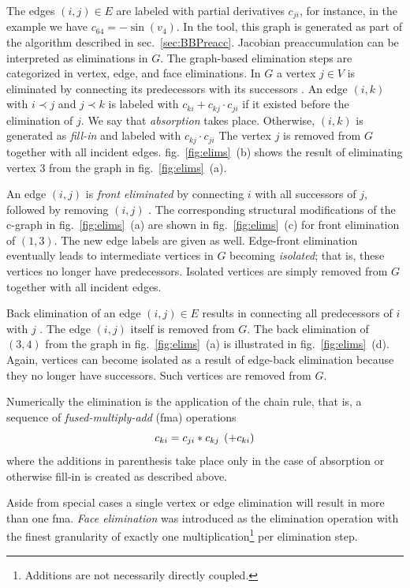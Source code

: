 \documentclass{book}
\newcommand{\refsec}[1]{{sec.~\ref{#1}}}
\newcommand{\reffig}[1]{{fig.~\ref{#1}}}
\begin{document}
The edges $(i,j)\in E$ are labeled with partial derivatives
$c_{ji}$, for instance, in the 
example we have $c_{64}=-\sin(v_4)$.
In the tool, this graph is generated as part of the algorithm described in 
\refsec{sec:BBPreacc}.
Jacobian preaccumulation can be interpreted as eliminations in $G$.
The graph-based elimination steps are categorized in vertex, edge, and face 
eliminations. 
In $G$ a vertex $j \in V$ is eliminated by connecting its predecessors with
its successors \cite{Griewank1991OtC}.
An edge $(i,k)$ with
$i \prec j$ and $j \prec k$ is labeled with
$c_{ki}+c_{kj} \cdot c_{ji}$ if it existed before the elimination of $j.$
We say that {\em absorption} takes place.
Otherwise, $(i,k)$ is generated as {\em fill-in} and labeled
with $c_{kj} \cdot c_{ji}$
The vertex $j$ is removed from
$G$ together with all incident edges. 
\reffig{fig:elims}~(b) shows the result of eliminating vertex $3$
from the graph in \reffig{fig:elims}~(a).

An edge $(i,j)$ is {\em front eliminated} by connecting $i$ with all successors
of $j$, followed by removing $(i,j)$ \cite{Naumann2002ETf}.
The corresponding structural modifications of the c-graph in
\reffig{fig:elims}~(a) are shown in
\reffig{fig:elims}~(c) for front elimination of $(1,3).$
The new edge labels are given as well.
Edge-front elimination eventually leads to intermediate vertices in $G$
becoming
{\em isolated}; that is, these vertices no longer have predecessors.
Isolated vertices are simply removed from $G$ together
with all incident edges.

Back elimination of an edge
$(i,j) \in E$ results in connecting all predecessors of $i$
with $j$ \cite{Naumann2002ETf}.
The edge $(i,j)$ itself is removed from $G.$
The back elimination of $(3,4)$ from the graph in \reffig{fig:elims}~(a) 
is illustrated in \reffig{fig:elims}~(d). 
Again, vertices can become isolated as a result of edge-back elimination
because they no longer have successors.
Such vertices are removed from $G.$

Numerically the elimination is the application of 
the chain rule, that is, a sequence of {\em fused-multiply-add} (fma) operations
\begin{equation}\label{eqn:fma}
  c_{ki}=c_{ji}*c_{kj}\hspace*{1ex}(+c_{ki}) 
\end{equation}
where the additions in parenthesis take place only  in the case of 
absorption or otherwise fill-in is created 
as described above.

Aside from special cases a single vertex or edge elimination will result in more
than one fma. {\em Face elimination} was introduced 
as the elimination operation with the finest granularity of exactly 
one multiplication\footnote{Additions are not necessarily directly coupled.} 
per elimination step.
\end{document}
